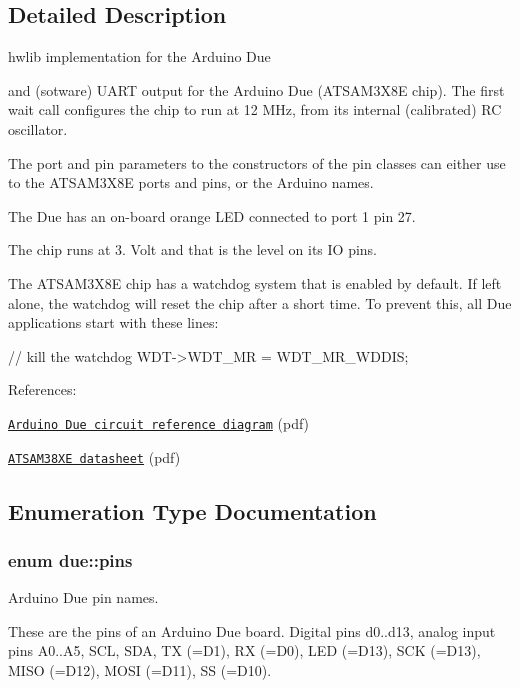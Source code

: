 \subsection{Detailed Description}
hwlib implementation for the Arduino Due 

 and (sotware) U\+A\+RT output for the Arduino Due (A\+T\+S\+A\+M3\+X8E chip). The first wait call configures the chip to run at 12 M\+Hz, from its internal (calibrated) RC oscillator.

The port and pin parameters to the constructors of the pin classes can either use to the A\+T\+S\+A\+M3\+X8E ports and pins, or the Arduino names.

The Due has an on-\/board orange L\+ED connected to port 1 pin 27.

The chip runs at 3. Volt and that is the level on its IO pins.



The A\+T\+S\+A\+M3\+X8E chip has a watchdog system that is enabled by default. If left alone, the watchdog will reset the chip after a short time. To prevent this, all Due applications start with these lines\+: 
\begin{DoxyCode}
\textcolor{comment}{// kill the watchdog}
WDT->WDT\_MR = WDT\_MR\_WDDIS;
\end{DoxyCode}


References\+:
\begin{DoxyItemize}
\item \href{https://www.arduino.cc/en/uploads/Main/arduino-uno-schematic.pdf}{\tt Arduino Due circuit reference diagram} (pdf)
\item \href{http://www.atmel.com/images/atmel-11057-32-bit-cortex-m3-microcontroller-sam3x-sam3a_datasheet.pdf}{\tt A\+T\+S\+A\+M38\+XE datasheet} (pdf) 
\end{DoxyItemize}

\subsection{Enumeration Type Documentation}
\subsubsection[{\texorpdfstring{pins}{pins}}]{\setlength{\rightskip}{0pt plus 5cm}enum {\bf due\+::pins}\hspace{0.3cm}{\ttfamily [strong]}}\hypertarget{namespacedue_a8ffa3ec309934ff9db34317e504bcc92}{}\label{namespacedue_a8ffa3ec309934ff9db34317e504bcc92}


Arduino Due pin names. 

These are the pins of an Arduino Due board. Digital pins d0..d13, analog input pins A0..A5, S\+CL, S\+DA, TX (=D1), RX (=D0), L\+ED (=D13), S\+CK (=D13), M\+I\+SO (=D12), M\+O\+SI (=D11), SS (=D10). 